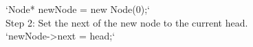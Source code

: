 \documentclass[preview]{standalone}
\begin{document}
`Node* newNode = new Node(0);`\\Step 2: Set the next of the new node to the current head.\\`newNode->next = head;`\\
\end{document}
